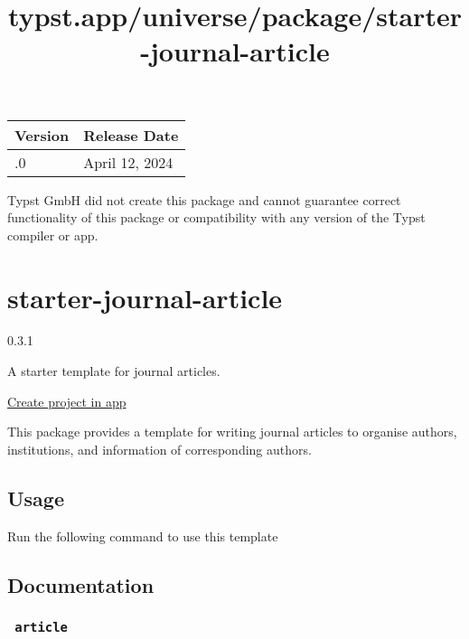 \begin{longtable}[]{@{}ll@{}}
\toprule\noalign{}
Version & Release Date \\
\midrule\noalign{}
\endhead
\bottomrule\noalign{}
\endlastfoot
0.1.0 & April 12, 2024 \\
\end{longtable}

Typst GmbH did not create this package and cannot guarantee correct
functionality of this package or compatibility with any version of the
Typst compiler or app.


\title{typst.app/universe/package/starter-journal-article}

\label{banner}
\label{template-thumbnail}

\section{starter-journal-article}\label{starter-journal-article}

{ 0.3.1 }

A starter template for journal articles.

\href{/app?template=starter-journal-article&version=0.3.1}{Create
project in app}

\label{readme}
This package provides a template for writing journal articles to
organise authors, institutions, and information of corresponding
authors.

\subsection{Usage}\label{usage}

Run the following command to use this template

\begin{Shaded}
\begin{Highlighting}[]
\end{Highlighting}
\end{Shaded}

\subsection{Documentation}\label{documentation}

\subsubsection{\texorpdfstring{\texttt{\ article\ }}{ article }}\label{article}

